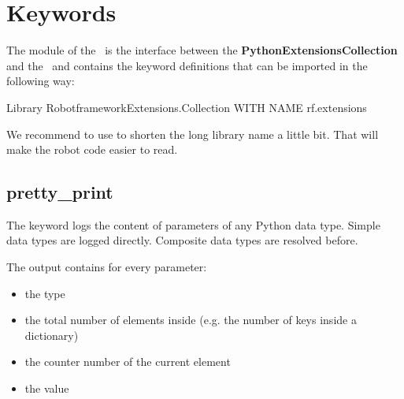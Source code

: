 %



%

\section{Keywords}

The  module of the \pkg\ is the interface between the \textbf{PythonExtensionsCollection} and the
\rfw\ and contains the keyword definitions that can be imported in the following way:

\begin{robotcode}
Library    RobotframeworkExtensions.Collection    WITH NAME    rf.extensions
\end{robotcode}

We recommend to use  to shorten the long library name a little bit. That will make the robot code
easier to read.

\subsection{pretty\_print}

The  keyword logs the content of parameters of any Python data type. Simple data types are logged directly.
Composite data types are resolved before.

\vspace{1ex}

The output contains for every parameter:

\begin{itemize}
   \item the type
   \item the total number of elements inside (e.g. the number of keys inside a dictionary)
   \item the counter number of the current element
   \item the value
\end{itemize}

